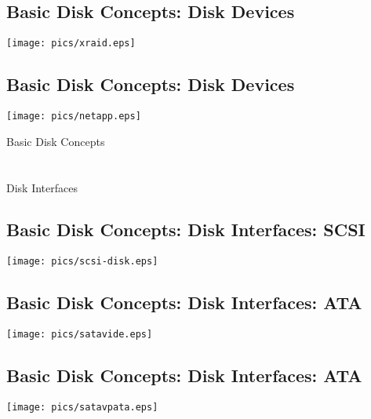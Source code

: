 \documentclass[xga]{xdvislides}
\begin{document}
\subsection{Basic Disk Concepts: Disk Devices}
	\begin{center}
		\texttt{[image: pics/xraid.eps]} \\
	\end{center}


\subsection{Basic Disk Concepts: Disk Devices}
	\begin{center}
		\texttt{[image: pics/netapp.eps]} \\
	\end{center}

\newpage
\vspace*{\fill}
\begin{center}
	\Hugesize
		Basic Disk Concepts \\ [1em]
	\hspace*{5mm}
	\blueline\\
	\hspace*{5mm}\\
		Disk Interfaces
\end{center}
\vspace*{\fill}

\subsection{Basic Disk Concepts: Disk Interfaces: SCSI}
\vfill
	\begin{center}
		\texttt{[image: pics/scsi-disk.eps]} \\
	\end{center}
\vfill

\subsection{Basic Disk Concepts: Disk Interfaces: ATA}
\vfill
	\begin{center}
		\texttt{[image: pics/satavide.eps]} \\
	\end{center}
\vfill

\subsection{Basic Disk Concepts: Disk Interfaces: ATA}
\vfill
	\begin{center}
		\texttt{[image: pics/satavpata.eps]} \\
	\end{center}
\vfill
\end{document}
